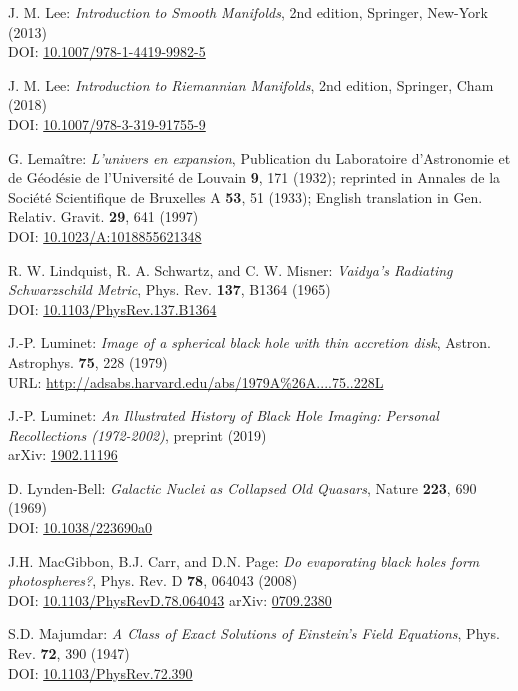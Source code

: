 \begin{thebibliography}{123}
J. M. Lee: {\em Introduction to Smooth Manifolds}, 2nd edition,
Springer, New-York (2013)\\
DOI: \href{https://doi.org/10.1007/978-1-4419-9982-5}{10.1007/978-1-4419-9982-5}

J. M. Lee: {\em Introduction to Riemannian Manifolds}, 2nd edition,
Springer, Cham (2018)\\
DOI: \href{https://doi.org/10.1007/978-3-319-91755-9}{10.1007/978-3-319-91755-9}

G. Lemaître: {\em L'univers en expansion},
Publication du Laboratoire d'Astronomie et de Géodésie de l'Université
de Louvain {\bf 9},  171 (1932); reprinted in
Annales de la Société Scientifique de Bruxelles A {\bf 53}, 51 (1933);
English translation in
Gen. Relativ. Gravit. {\bf 29}, 641 (1997)\\
DOI: \href{https://doi.org/10.1023/A:1018855621348}{10.1023/A:1018855621348}

R. W. Lindquist, R. A. Schwartz, and C. W. Misner:
{\em Vaidya's Radiating Schwarzschild Metric},
Phys. Rev. {\bf 137}, B1364 (1965)\\
DOI: \href{https://doi.org/10.1103/PhysRev.137.B1364}{10.1103/PhysRev.137.B1364}

J.-P. Luminet: {\em Image of a spherical black hole with thin accretion disk},
Astron. Astrophys. {\bf 75}, 228 (1979)\\
URL: \url{http://adsabs.harvard.edu/abs/1979A%26A....75..228L}

J.-P. Luminet:
{\em An Illustrated History of Black Hole Imaging: Personal Recollections (1972-2002)}, preprint (2019)\\
arXiv: \href{https://arxiv.org/abs/1902.11196}{1902.11196}

D. Lynden-Bell:
{\em Galactic Nuclei as Collapsed Old Quasars},
Nature {\bf 223}, 690 (1969)\\
DOI: \href{https://doi.org/10.1038/223690a0}{10.1038/223690a0}

J.H. MacGibbon, B.J. Carr, and D.N. Page:
{\em Do evaporating black holes form photospheres?},
Phys. Rev. D {\bf 78}, 064043 (2008)\\
DOI: \href{https://doi.org/10.1103/PhysRevD.78.064043}{10.1103/PhysRevD.78.064043}\hfill
arXiv: \href{https://arxiv.org/abs/0709.2380}{0709.2380}

S.D. Majumdar:
{\em A Class of Exact Solutions of Einstein's Field Equations},
Phys. Rev. {\bf 72}, 390 (1947)\\
DOI: \href{https://doi.org/10.1103/PhysRev.72.390}{10.1103/PhysRev.72.390}


\end{thebibliography}
